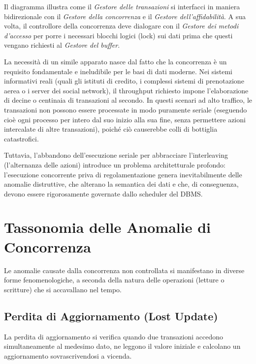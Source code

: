 Il diagramma illustra come il \textit{Gestore delle transazioni} si interfacci in maniera bidirezionale con il \textit{Gestore della concorrenza} e il \textit{Gestore dell'affidabilità}. A sua volta, il controllore della concorrenza deve dialogare con il \textit{Gestore dei metodi d'accesso} per porre i necessari blocchi logici (lock) sui dati prima che questi vengano richiesti al \textit{Gestore del buffer}.

La necessità di un simile apparato nasce dal fatto che la concorrenza è un requisito fondamentale e ineludibile per le basi di dati moderne. Nei sistemi informativi reali (quali gli istituti di credito, i complessi sistemi di prenotazione aerea o i server dei social network), il throughput richiesto impone l'elaborazione di decine o centinaia di transazioni al secondo. In questi scenari ad alto traffico, le transazioni non possono essere processate in modo puramente seriale (eseguendo cioè ogni processo per intero dal suo inizio alla sua fine, senza permettere azioni intercalate di altre transazioni), poiché ciò causerebbe colli di bottiglia catastrofici.

Tuttavia, l'abbandono dell'esecuzione seriale per abbracciare l'interleaving (l'alternanza delle azioni) introduce un problema architetturale profondo: l'esecuzione concorrente priva di regolamentazione genera inevitabilmente delle anomalie distruttive, che alterano la semantica dei dati e che, di conseguenza, devono essere rigorosamente governate dallo scheduler del DBMS.

\section{Tassonomia delle Anomalie di Concorrenza}

Le anomalie causate dalla concorrenza non controllata si manifestano in diverse forme fenomenologiche, a seconda della natura delle operazioni (letture o scritture) che si accavallano nel tempo.

\subsection{Perdita di Aggiornamento (Lost Update)}

La perdita di aggiornamento si verifica quando due transazioni accedono simultaneamente al medesimo dato, ne leggono il valore iniziale e calcolano un aggiornamento sovrascrivendosi a vicenda.

